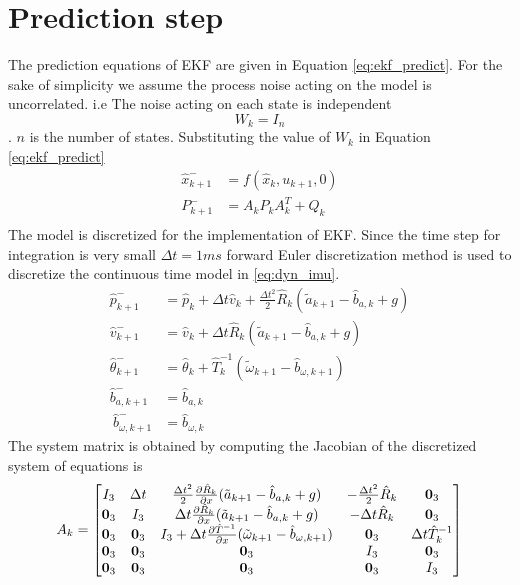 \section{Prediction step}
The prediction equations of EKF are given in Equation \ref{eq:ekf_predict}. For the sake of simplicity we assume the process noise acting on the model is uncorrelated. i.e The noise acting on each state is independent $$W_k = I_n$$. $n$ is the number of states. Substituting the value of $W_k$ in Equation \ref{eq:ekf_predict}
\begin{equation}
\label{eq:imu_predict}
\begin{split}
\hat{x}_{k+1}^- &= f(\hat{x}_{k},u_{k+1},0)\\
P_{k+1}^- &= A_kP_{k}A_k^T + Q_{k}\\
\end{split}
\end{equation}
The model is discretized for the implementation of EKF. Since the time step for integration is very small $\Delta t = 1ms$ forward Euler discretization method is used to discretize the continuous time model in \ref{eq:dyn_imu}.
\begin{equation}
    \label{eq:dyn_imu_disc}
    \begin{split}
    \hat{p}_{k+1}^- &= \hat{p}_k + \Delta t \hat{v}_k + \frac{\Delta t^2}{2} \hat{R}_k (\tilde{a}_{k+1} - \hat{b}_{a,k} +g) \\
    \hat{v}_{k+1}^- &= \hat{v}_k + \Delta t \hat{R}_k (\tilde{a}_{k+1} - \hat{b}_{a,k} +g) \\
    \hat{\theta}_{k+1}^- &= \hat{\theta}_k + \hat{T}_k^{-1}(\tilde{\omega}_{k+1} - \hat{b}_{\omega,k+1}) \\
    \hat{b}_{a,k+1}^- &= \hat{b}_{a,k}\\\
    \hat{b}_{\omega,k+1}^- &= \hat{b}_{\omega,k}
    \end{split}
\end{equation}
The system matrix is obtained by computing the Jacobian of the discretized system of equations is
\begin{equation}
    A_k = \begin{bmatrix}
    I_3 &\Delta t &\frac{\Delta t^2}{2} \frac{\partial {\hat{R}_k}}{\partial {x}}(\tilde{a}_{k+1} - \hat{b}_{a,k} +g) &-\frac{\Delta t^2}{2} \hat{R}_k &\textbf{0}_3 \\
    \textbf{0}_3 &I_3  &\Delta t \frac{\partial {\hat{R}_k}}{\partial {x}}(\tilde{a}_{k+1} - \hat{b}_{a,k} +g) &-\Delta t\hat{R}_k &\textbf{0}_3\\
    \textbf{0}_3  &\textbf{0}_3 &I_3 + \Delta t \frac{\partial {\hat{T}^{-1}}}{\partial {x}}(\tilde{\omega}_{k+1} - \hat{b}_{\omega,k+1}) &\textbf{0}_3 &\Delta t \hat{T}_k^{-1}\\
    \textbf{0}_3  &\textbf{0}_3  &\textbf{0}_3  &I_3 &\textbf{0}_3 \\
    \textbf{0}_3  &\textbf{0}_3  &\textbf{0}_3  &\textbf{0}_3 &I_3
    \end{bmatrix}
\end{equation}

